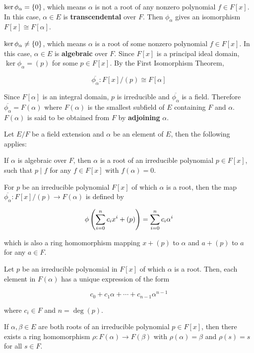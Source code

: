 \documentclass[a4paper,12pt]{article}
\begin{document}
\begin{nlist}
  \item $\ker\phi_{\alpha}=\left\{ 0\right\}$, which means $\alpha$ is not a root of any nonzero polynomial $f\in F[x]$. In this case, $\alpha\in E$ is \textbf{transcendental} over $F$. Then $\phi_{\alpha}$ gives an isomorphism $F[x]\cong F[\alpha]$.
  \item $\ker\phi_{\alpha}\neq\left\{ 0\right\}$, which means $\alpha$ is a root of some nonzero polynomial $f\in F[x]$. In this case, $\alpha\in E$ is \textbf{algebraic} over $F$. Since $F[x]$ is a principal ideal domain, $\ker\phi_{\alpha}=(p)$ for some $p\in F[x]$. By the First Isomorphism Theorem,
  
  $$\overline{\phi_{\alpha}}:F[x]/(p)\cong F[\alpha]$$\s

  Since $F[\alpha]$ is an integral domain, $p$ is irreducible and $\overline{\phi_{\alpha}}$ is a field. Therefore $\overline{\phi_{\alpha}}=F(\alpha)$ where $F(\alpha)$ is the smallest subfield of $E$ containing $F$ and $\alpha$. $F(\alpha)$ is said to be obtained from $F$ by \textbf{adjoining} $\alpha$.
\end{nlist}

\begin{thm}
  Let $E/F$ be a field extension and $\alpha$ be an element of $E$, then the following applies:

  \begin{alist}
    \item If $\alpha$ is algebraic over $F$, then $\alpha$ is a root of an irreducible polynomial $p\in F[x]$, such that $p\!\mid\!f$ for any $f\in F[x]$ with $f(\alpha)=0$.
    \item For $p$ be an irreducible polynomial $F[x]$ of which $\alpha$ is a root, then the map $\overline{\phi_{\alpha}}:F[x]/(p)\to F(\alpha)$ is defined by
    
    $$\phi\left( \sum_{i=0}^{n}c_{i}x^{i}+(p)\right)=\sum_{i=0}^{n}c_{i}\alpha^{i}$$\s

    which is also a ring homomorphism mapping $x+(p)$ to $\alpha$ and $a+(p)$ to $a$ for any $a\in F$.
    \item Let $p$ be an irreducible polynomial in $F[x]$ of which $\alpha$ is a root. Then, each element in $F(\alpha)$ has a unique expression of the form
    
    $$c_{0}+c_{1}\alpha+\cdots+c_{n-1}\alpha^{n-1}$$\s

    where $c_{i}\in F$ and $n=\deg(p)$.
    \item If $\alpha,\beta\in E$ are both roots of an irreducible polynomial $p\in F[x]$, then there exists a ring homomorphism $\rho:F(\alpha)\to F(\beta)$ with $\rho(\alpha)=\beta$ and $\rho(s)=s$ for all $s\in F$.
  \end{alist}
\end{thm}
\end{document}
